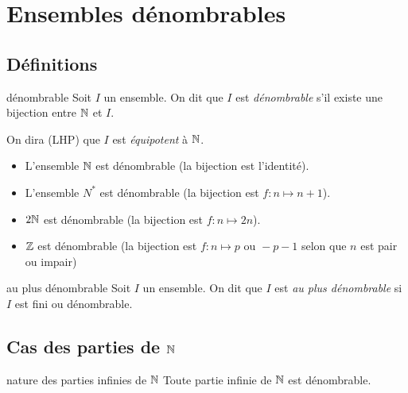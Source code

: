 
\section{Ensembles dénombrables}
\subsection{Définitions }

\begin{definition}{dénombrable}{}
    Soit $I$ un ensemble. On dit que $I$ est \emph{dénombrable} 
    s'il existe une bijection entre $\mathbb{N}$ et $I$. 

    On dira (LHP) que $I$ est \emph{équipotent} à $\mathbb{N}$.
\end{definition}

\begin{exemple}
    \begin{itemize}
        \item L'ensemble $\mathbb{N}$ est dénombrable (la bijection est l'identité).
        \item L'ensemble $N^*$ est dénombrable (la bijection est $f : n \mapsto n+1$).
        \item $2 \mathbb{N}$ est dénombrable (la bijection est $f : n \mapsto 2n$).
        \item $\mathbb{Z}$ est dénombrable (la bijection est $f : n \mapsto p \text{ ou } -p-1$ selon que $n$ est pair ou impair)
    \end{itemize}
\end{exemple}


\begin{definition}{au plus dénombrable}{}
    Soit $I$ un ensemble. On dit que $I$ est \emph{au plus dénombrable} si $I$ est 
    fini ou dénombrable.
\end{definition}

\subsection{Cas des parties de \texorpdfstring{$\mathbb{N}$}{N}}

\begin{theoreme}{nature des parties infinies de $\mathbb{N}$}{}
    Toute partie infinie de $\mathbb{N}$ est dénombrable.
\end{theoreme}


